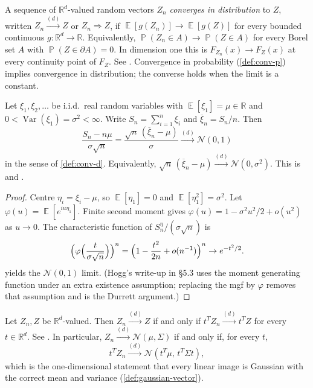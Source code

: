 \documentclass[11pt,a4paper]{article}
\DeclareMathOperator{\Var}{Var}
\DeclareMathOperator{\E}{\mathbb{E}}
\DeclareMathOperator{\Pbb}{\mathbb{P}}
\begin{document}
\begin{definition}
\label{def:conv-d}
A sequence of \(\mathbb{R}^{d}\)-valued random vectors \( Z_n \) \emph{converges in distribution} to \( Z \), written \( Z_n\xrightarrow{(d)}Z \) or \( Z_n\Rightarrow Z \), if \( \E[g(Z_n)]\to\E[g(Z)] \) for every bounded continuous \( g:\mathbb{R}^{d}\to\mathbb{R} \). Equivalently, \( \Pbb(Z_n\in A)\to\Pbb(Z\in A) \) for every Borel set \( A \) with \( \Pbb(Z\in\partial A)=0 \). In dimension one this is \( F_{Z_n}(x)\to F_Z(x) \) at every continuity point of \( F_Z \). See \citep[Theorems~3.2.3 and~3.2.5]{durrett2010}. Convergence in probability (\cref{def:conv-p}) implies convergence in distribution; the converse holds when the limit is a constant.
\end{definition}

\begin{theorem}
\label{thm:clt}
Let \( \xi_1,\xi_2,\dots \) be i.i.d.\ real random variables with \( \E[\xi_1]=\mu\in\mathbb{R} \) and \( 0<\Var(\xi_1)=\sigma^{2}<\infty \). Write \( S_n=\sum_{i=1}^{n}\xi_i \) and \( \overline{\xi}_n=S_n/n \). Then
\[
\frac{S_n-n\mu}{\sigma\sqrt{n}}
=
\frac{\sqrt{n}\,(\overline{\xi}_n-\mu)}{\sigma}
\xrightarrow{(d)}
\mathcal{N}(0,1)
\]
in the sense of \cref{def:conv-d}. Equivalently, \( \sqrt{n}\,(\overline{\xi}_n-\mu)\xrightarrow{(d)}\mathcal{N}(0,\sigma^{2}) \). This is \citep[Theorem~5.3.1]{hogg2019} and \citep[Theorem~3.4.1]{durrett2010}.
\end{theorem}

\begin{proof}
Centre \( \eta_i=\xi_i-\mu \), so \( \E[\eta_1]=0 \) and \( \E[\eta_1^{2}]=\sigma^{2} \). Let \( \varphi(u)=\E[e^{iu\eta_1}] \). Finite second moment gives \( \varphi(u)=1-\sigma^{2}u^{2}/2+o(u^{2}) \) as \( u\to 0 \). The characteristic function of \( S_n^{\eta}/(\sigma\sqrt{n}) \) is
\[
\Bigl(\varphi\Bigl(\frac{t}{\sigma\sqrt{n}}\Bigr)\Bigr)^{n}
=
\Bigl(1-\frac{t^{2}}{2n}+o(n^{-1})\Bigr)^{n}
\to
e^{-t^{2}/2}.
\]
 yields the \( \mathcal{N}(0,1) \) limit. (Hogg's write-up in \S5.3 uses the moment generating function under an extra existence assumption; replacing the mgf by \( \varphi \) removes that assumption and is the Durrett argument.)
\end{proof}

\begin{theorem}
\label{thm:cramer-wold}
Let \( Z_n,Z \) be \(\mathbb{R}^{d}\)-valued. Then \( Z_n\xrightarrow{(d)}Z \) if and only if \( t^{T}Z_n\xrightarrow{(d)}t^{T}Z \) for every \( t\in\mathbb{R}^{d} \). See \citep[\S3.9]{durrett2010}. In particular, \( Z_n\xrightarrow{(d)}\mathcal{N}(\mu,\Sigma) \) if and only if, for every \( t \),
\[
t^{T}Z_n
\xrightarrow{(d)}
\mathcal{N}(t^{T}\mu,\,t^{T}\Sigma t),
\]
which is the one-dimensional statement that every linear image is Gaussian with the correct mean and variance (\cref{def:gaussian-vector}).
\end{theorem}
\end{document}
